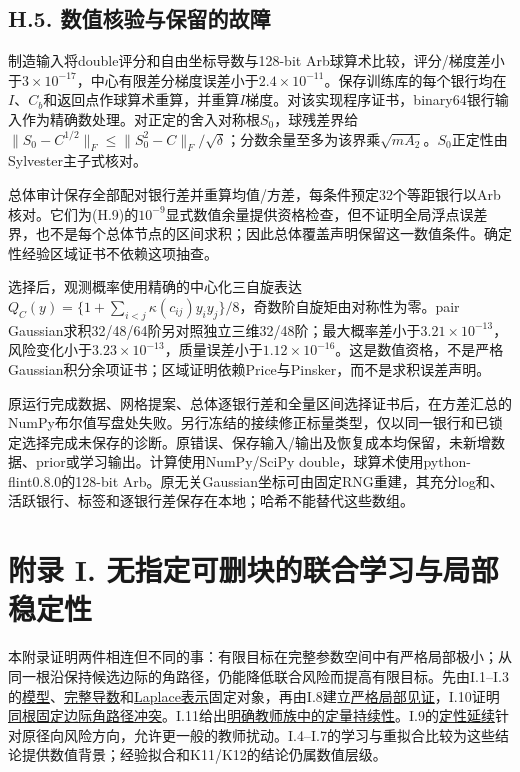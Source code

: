\documentclass[11pt,a4paper]{article}
\begin{document}
\subsection*{H.5.
数值核验与保留的故障}\label{h.5.-ux6570ux503cux6838ux9a8cux4e0eux4fddux7559ux7684ux6545ux969c}

制造输入将double评分和自由坐标导数与128-bit
Arb球算术比较，评分/梯度差小于\(3\times10^{-17}\)，中心有限差分梯度误差小于\(2.4\times10^{-11}\)。保存训练库的每个银行均在\(I\)、\(C_b\)和返回点作球算术重算，并重算\(I\)梯度。对该实现程序证书，binary64银行输入作为精确数处理。对正定的舍入对称根\(S_0\)，球残差界给\(\|S_0-C^{1/2}\|_F\le\|S_0^2-C\|_F/\sqrt\delta\)；分数余量至多为该界乘\(\sqrt{mA_2}\)。\(S_0\)正定性由Sylvester主子式核对。

总体审计保存全部配对银行差并重算均值/方差，每条件预定32个等距银行以Arb核对。它们为(H.9)的\(10^{-9}\)显式数值余量提供资格检查，但不证明全局浮点误差界，也不是每个总体节点的区间求积；因此总体覆盖声明保留这一数值条件。确定性经验区域证书不依赖这项抽查。

选择后，观测概率使用精确的中心化三自旋表达\(Q_C(y)=\{1+\sum_{i<j}\kappa(c_{ij})y_iy_j\}/8\)，奇数阶自旋矩由对称性为零。pair
Gaussian求积32/48/64阶另对照独立三维32/48阶；最大概率差小于\(3.21\times10^{-13}\)，风险变化小于\(3.23\times10^{-13}\)，质量误差小于\(1.12\times10^{-16}\)。这是数值资格，不是严格Gaussian积分余项证书；区域证明依赖Price与Pinsker，而不是求积误差声明。

原运行完成数据、网格提案、总体逐银行差和全量区间选择证书后，在方差汇总的NumPy布尔值写盘处失败。另行冻结的接续修正标量类型，仅以同一银行和已锁定选择完成未保存的诊断。原错误、保存输入/输出及恢复成本均保留，未新增数据、prior或学习输出。计算使用NumPy/SciPy
double，球算术使用python-flint0.8.0的128-bit
Arb。原无关Gaussian坐标可由固定RNG重建，其充分log和、活跃银行、标签和逐银行差保存在本地；哈希不能替代这些数组。

\clearpage

\section*{附录 I.
无指定可删块的联合学习与局部稳定性}\label{ux9644ux5f55-i.-ux65e0ux6307ux5b9aux53efux5220ux5757ux7684ux8054ux5408ux5b66ux4e60ux4e0eux5c40ux90e8ux7a33ux5b9aux6027}

本附录证明两件相连但不同的事：有限目标在完整参数空间中有严格局部极小；从同一根沿保持候选边际的角路径，仍能降低联合风险而提高有限目标。先由I.1--I.3的\hyperref[dense-model]{模型}、\hyperref[full-derivatives]{完整导数}和\hyperref[laplace-representation]{Laplace表示}固定对象，再由I.8建立\hyperref[proof-theorem-3]{严格局部见证}，I.10证明\hyperref[same-root-angle]{同根固定边际角路径冲突}。I.11给出\hyperref[quantitative-teacher-family]{明确教师族中的定量持续性}。I.9的\hyperref[local-persistence]{定性延续}针对原径向风险方向，允许更一般的教师扰动。I.4--I.7的学习与重拟合比较为这些结论提供数值背景；经验拟合和K11/K12的结论仍属数值层级。
\end{document}
